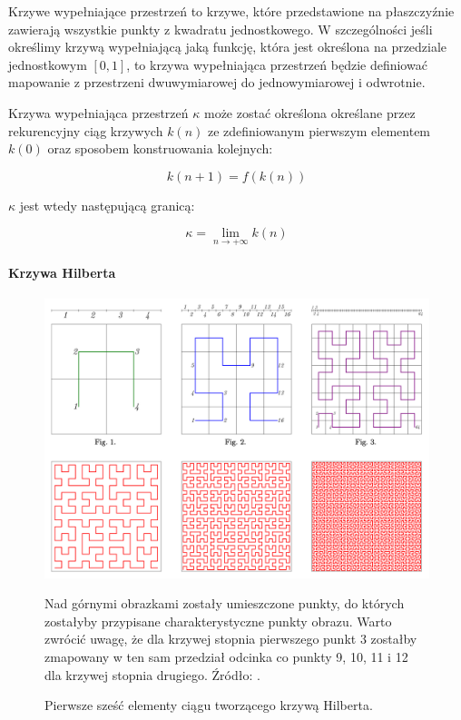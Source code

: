 \documentclass[oneside, mag]{mgr}
\begin{document}
Krzywe wypełniające przestrzeń to krzywe, które przedstawione na płaszczyźnie zawierają wszystkie punkty z kwadratu jednostkowego. W szczególności jeśli określimy krzywą wypełniającą jaką funkcję, która jest określona na przedziale jednostkowym $[0, 1]$, to krzywa wypełniająca przestrzeń będzie definiować mapowanie z przestrzeni dwuwymiarowej do jednowymiarowej i odwrotnie. 

Krzywa wypełniająca przestrzeń $\kappa$ może zostać określona określane przez rekurencyjny ciąg krzywych $k(n)$ ze zdefiniowanym pierwszym elementem $k(0)$ oraz sposobem konstruowania kolejnych:

\begin{equation}
	k(n+1) = f(k(n))
\end{equation}

$\kappa$ jest wtedy następującą granicą:

\begin{equation}
	\kappa = \lim_{n \rightarrow + \infty } k(n)
\end{equation}

\paragraph{Krzywa Hilberta}

\begin{figure}
\centering
	\includegraphics[width=1.0\textwidth]{img/hilbert_curve.png}
	\caption{Pierwsze sześć elementy ciągu tworzącego krzywą Hilberta.} Nad górnymi obrazkami zostały umieszczone punkty, do których zostałyby przypisane charakterystyczne punkty obrazu. Warto zwrócić uwagę, że dla krzywej stopnia pierwszego punkt 3 zostałby zmapowany w ten sam przedział odcinka co punkty 9, 10, 11 i 12 dla krzywej stopnia drugiego. Źródło: \cite{hilbert}.
	\label{fig:hilbert}
\end{figure}
\end{document}
